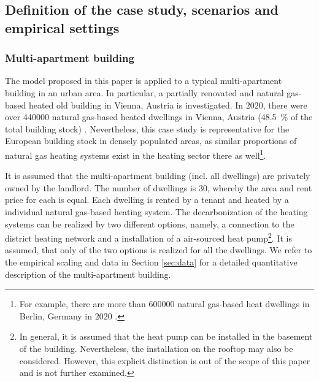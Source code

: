 \subsection{Definition of the case study, scenarios and empirical settings}\label{met:empirical}
\subsubsection{Multi-apartment building}
The model proposed in this paper is applied to a typical multi-apartment building in an urban area. In particular, a partially renovated and natural gas-based heated old building in Vienna, Austria is investigated. In $2020$, there were over \SI{440000}{} natural gas-based heated dwellings in Vienna, Austria (\SI{48.5}{\%} of the total building stock) \cite{statistikaustriaheizen}. Nevertheless, this case study is representative for the European building stock in densely populated areas, as similar proportions of natural gas heating systems exist in the heating sector there as well\footnote{For example, there are more than \SI{600000}{} natural gas-based heat dwellings in Berlin, Germany in $2020$ \cite{BDEW2019}.}.\vspace{0.5cm}

It is assumed that the multi-apartment building (incl. all dwellings) are privately owned by the landlord. The number of dwellings is $30$, whereby the area and rent price for each is equal. Each dwelling is rented by a tenant and heated by a individual natural gas-based heating system. The decarbonization of the heating systems can be realized by two different options, namely, a connection to the district heating network and a installation of a air-sourced heat pump\footnote{In general, it is assumed that the heat pump can be installed in the basement of the building. Nevertheless, the installation on the rooftop may also be considered. However, this explicit distinction is out of the scope of this paper and is not further examined.}. It is assumed, that only of the two options is realized for all the dwellings. We refer to the empirical scaling and data in Section \ref{sec:data} for a detailed quantitative description of the multi-apartment building. 


